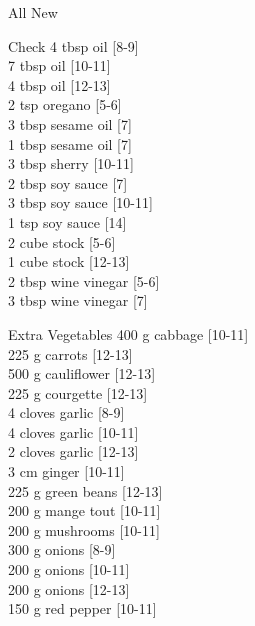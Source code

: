 \begin{menu}{All New}
\begin{shoppinglist}{Check}
      4 tbsp oil 
        {\scriptsize[8-9]}\\
      7 tbsp oil 
        {\scriptsize[10-11]}\\
      4 tbsp oil 
        {\scriptsize[12-13]}\\
      2 tsp oregano 
        {\scriptsize[5-6]}\\
      3 tbsp sesame oil 
        {\scriptsize[7]}\\
      1 tbsp sesame oil 
        {\scriptsize[7]}\\
      3 tbsp sherry 
        {\scriptsize[10-11]}\\
      2 tbsp soy sauce 
        {\scriptsize[7]}\\
      3 tbsp soy sauce 
        {\scriptsize[10-11]}\\
      1 tsp soy sauce 
        {\scriptsize[14]}\\
      2 cube stock 
        {\scriptsize[5-6]}\\
      1 cube stock 
        {\scriptsize[12-13]}\\
      2 tbsp wine vinegar 
        {\scriptsize[5-6]}\\
      3 tbsp wine vinegar 
        {\scriptsize[7]}\\
      \end{shoppinglist}%
      \begin{shoppinglist}{Extra Vegetables}
      400 g cabbage 
        {\scriptsize[10-11]}\\
      225 g carrots 
        {\scriptsize[12-13]}\\
      500 g cauliflower 
        {\scriptsize[12-13]}\\
      225 g courgette 
        {\scriptsize[12-13]}\\
      4 cloves garlic 
        {\scriptsize[8-9]}\\
      4 cloves garlic 
        {\scriptsize[10-11]}\\
      2 cloves garlic 
        {\scriptsize[12-13]}\\
      3 cm ginger 
        {\scriptsize[10-11]}\\
      225 g green beans 
        {\scriptsize[12-13]}\\
      200 g mange tout 
        {\scriptsize[10-11]}\\
      200 g mushrooms 
        {\scriptsize[10-11]}\\
      300 g onions 
        {\scriptsize[8-9]}\\
      200 g onions 
        {\scriptsize[10-11]}\\
      200 g onions 
        {\scriptsize[12-13]}\\
      150 g red pepper 
        {\scriptsize[10-11]}\\
      \end{shoppinglist}%
      \par\vfil %
    \vfil\clearpage
  

\end{menu}
